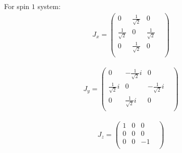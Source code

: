 \documentclass[10pt,a4paper]{article}
\begin{document}
For spin $1$ system:\begin{align}
J_x = \begin{pmatrix}
0&\frac{1}{\sqrt{2}}&0&\\\frac{1}{\sqrt{2}}&0&\frac{1}{\sqrt{2}}&\\0&\frac{1}{\sqrt{2}}&0&\\\end{pmatrix}\end{align}

\begin{align}
J_y = \begin{pmatrix}
0&-\frac{1}{\sqrt{2}}i&0&\\\frac{1}{\sqrt{2}}i&0&-\frac{1}{\sqrt{2}}i&\\0&\frac{1}{\sqrt{2}}i&0&\\\end{pmatrix}\end{align}

\begin{align}
J_z = \begin{pmatrix}
1&0&0&\\0&0&0&\\0&0&-1&\\\end{pmatrix}\end{align}
\end{document}
